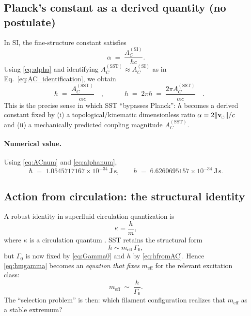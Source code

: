 \documentclass[pdflatex,sn-mathphys-num]{revtex4-2}
\newcommand{\swirlarrow}{\mathchoice{\mkern-2mu\scriptstyle\boldsymbol{\circlearrowleft}}{\mkern-2mu\scriptstyle\boldsymbol{\circlearrowleft}}{\mkern-2mu\scriptscriptstyle\boldsymbol{\circlearrowleft}}{\mkern-2mu\scriptscriptstyle\boldsymbol{\circlearrowleft}}}
\newcommand{\vswirl}{\mathbf{v}_{\swirlarrow}}
\newcommand{\vnorm}{\lVert \vswirl \rVert}
\newcommand{\clight}{c}
\begin{document}
    \subsection{Planck's constant as a derived quantity (no postulate)}
    In SI, the fine-structure constant satisfies
    \begin{equation}
        \alpha \;=\; \frac{A_C^{\mathrm{(SI)}}}{\hbar \clight}.
        \label{eq:alphaStandard}
    \end{equation}
    Using \eqref{eq:alpha} and identifying \(A_C^{\mathrm{(SST)}}\approx A_C^{\mathrm{(SI)}}\) as in
    Eq.~\eqref{eq:AC_identification}, we obtain
    \begin{equation}
        \boxed{\quad \hbar \;=\; \frac{A_C^{\mathrm{(SST)}}}{\alpha \clight}\quad},\qquad
        \boxed{\quad h \;=\; 2\pi\hbar \;=\; \frac{2\pi A_C^{\mathrm{(SST)}}}{\alpha \clight}\quad}.
        \label{eq:hfromAC}
    \end{equation}
    This is the precise sense in which SST ``bypasses Planck'': \(h\) becomes a derived constant fixed by
    (i) a topological/kinematic dimensionless ratio \(\alpha=2\vnorm/\clight\) and (ii) a mechanically predicted coupling magnitude \(A_C^{\mathrm{(SST)}}\).

    \paragraph{Numerical value.}
        Using \eqref{eq:ACnum} and \eqref{eq:alphanum},
        \begin{equation}
            \hbar \;=\; 1.0545717167\times 10^{-34}\ \mathrm{J\,s},\qquad
            h \;=\; 6.6260695157\times 10^{-34}\ \mathrm{J\,s}.
            \label{eq:hnum}
        \end{equation}

    \subsection{Action from circulation: the structural identity}
    A robust identity in superfluid circulation quantization is
    \begin{equation}
        \kappa = \frac{h}{m},
        \label{eq:superfluid}
    \end{equation}
    where \(\kappa\) is a circulation quantum \cite{Onsager1949,Feynman1955}.
    SST retains the structural form
    \begin{equation}
        h \sim m_{\text{eff}}\,\Gamma_0,
        \label{eq:hmgamma}
    \end{equation}
    but \(\Gamma_0\) is now fixed by \eqref{eq:Gamma0} and \(h\) by \eqref{eq:hfromAC}. Hence \eqref{eq:hmgamma}
    becomes an \emph{equation that fixes} \(m_{\text{eff}}\) for the relevant excitation class:
    \begin{equation}
        m_{\text{eff}} \;\sim\; \frac{h}{\Gamma_0}.
    \end{equation}
    The ``selection problem'' is then: which filament configuration realizes that \(m_{\text{eff}}\) as a stable extremum?
\end{document}
